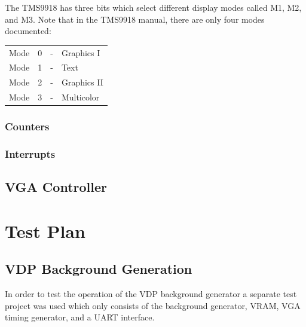 \documentclass{article}
\begin{document}
The TMS9918 has three bits which select different display modes called M1, M2,
and M3. Note that in the TMS9918 manual, there are only four modes documented:

\begin{table}[H]
    \centering
    \begin{tabular}{l c c l}
        Mode & 0 & - & Graphics I   \\
        Mode & 1 & - & Text         \\
        Mode & 2 & - & Graphics II  \\
        Mode & 3 & - & Multicolor   \\
    \end{tabular}
\end{table}

\subsubsection{Counters}
\subsubsection{Interrupts}
\subsection{VGA Controller}

\newpage
\section{Test Plan}

\subsection{VDP Background Generation}

In order to test the operation of the VDP background generator a separate test
project was used which only consists of the background generator, VRAM, VGA timing
generator, and a UART interface.
\end{document}
